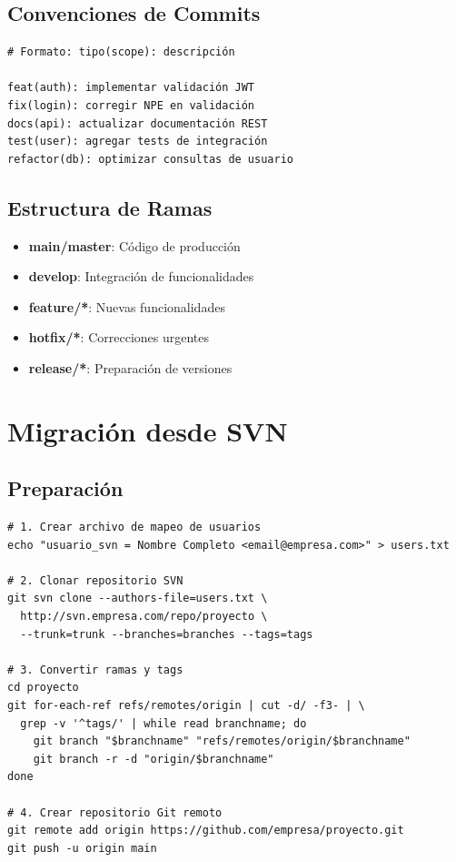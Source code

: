 \documentclass[12pt,a4paper]{article}
\begin{document}
\subsection{Convenciones de Commits}
\begin{lstlisting}[caption=Formato de mensajes de commit]
# Formato: tipo(scope): descripción

feat(auth): implementar validación JWT
fix(login): corregir NPE en validación
docs(api): actualizar documentación REST
test(user): agregar tests de integración
refactor(db): optimizar consultas de usuario
\end{lstlisting}

\subsection{Estructura de Ramas}
\begin{itemize}
    \item \textbf{main/master}: Código de producción
    \item \textbf{develop}: Integración de funcionalidades
    \item \textbf{feature/*}: Nuevas funcionalidades
    \item \textbf{hotfix/*}: Correcciones urgentes
    \item \textbf{release/*}: Preparación de versiones
\end{itemize}

\section{Migración desde SVN}

\subsection{Preparación}
\begin{lstlisting}[caption=Pasos para migrar desde SVN]
# 1. Crear archivo de mapeo de usuarios
echo "usuario_svn = Nombre Completo <email@empresa.com>" > users.txt

# 2. Clonar repositorio SVN
git svn clone --authors-file=users.txt \
  http://svn.empresa.com/repo/proyecto \
  --trunk=trunk --branches=branches --tags=tags

# 3. Convertir ramas y tags
cd proyecto
git for-each-ref refs/remotes/origin | cut -d/ -f3- | \
  grep -v '^tags/' | while read branchname; do
    git branch "$branchname" "refs/remotes/origin/$branchname"
    git branch -r -d "origin/$branchname"
done

# 4. Crear repositorio Git remoto
git remote add origin https://github.com/empresa/proyecto.git
git push -u origin main
\end{lstlisting}
\end{document}
